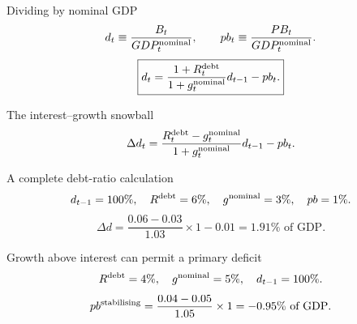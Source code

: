 \documentclass[12pt,aspectratio=169]{beamer}
\begin{document}

\begin{frame}{Dividing by nominal GDP}
\[d_t\equiv\frac{B_t}{GDP_t^{\rm nominal}},\qquad pb_t\equiv\frac{PB_t}{GDP_t^{\rm nominal}}.\]\[\boxed{d_t=\frac{1+R_t^{\rm debt}}{1+g_t^{\rm nominal}}d_{t-1}-pb_t.}\]
\end{frame}


\begin{frame}{The interest–growth snowball}
\[\Delta d_t=\frac{R_t^{\rm debt}-g_t^{\rm nominal}}{1+g_t^{\rm nominal}}d_{t-1}-pb_t.\]
\end{frame}


\begin{frame}{A complete debt-ratio calculation}
\[d_{t-1}=100\%,\quad R^{\rm debt}=6\%,\quad g^{\rm nominal}=3\%,\quad pb=1\%.\]\[\Delta d=\frac{0.06-0.03}{1.03}\times1-0.01=1.91\%\text{ of GDP}.\]
\end{frame}


\begin{frame}{Growth above interest can permit a primary deficit}
\[R^{\rm debt}=4\%,\quad g^{\rm nominal}=5\%,\quad d_{t-1}=100\%.\]\[pb^{\rm stabilising}=\frac{0.04-0.05}{1.05}\times1=-0.95\%\text{ of GDP}.\]
\end{frame}

\end{document}
